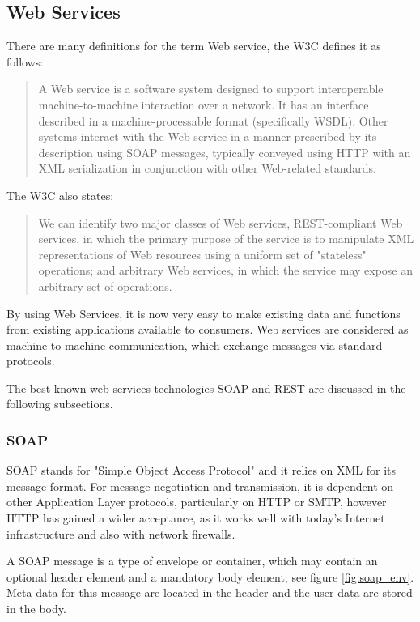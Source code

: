 \subsection{Web Services\label{sec:back_tech_ws}}

There are many definitions for the term Web service, the \ac{W3C} defines it as follows:\cite{W3C}\\
\begin{quote}
A Web service is a software system designed to support interoperable machine-to-machine interaction over a network. It has an interface described in a machine-processable format (specifically \ac{WSDL}). Other systems interact with the Web service in a manner prescribed by its description using \ac{SOAP} messages, typically conveyed using \ac{HTTP} with an \ac{XML} serialization in conjunction with other Web-related standards.
\end{quote}

The \ac{W3C} also states:\cite{W3C} 
\begin{quote}
We can identify two major classes of Web services, \ac{REST}-compliant Web services, in which the primary purpose of the service is to manipulate \ac{XML} representations of Web resources using a uniform set of "stateless" operations; and arbitrary Web services, in which the service may expose an arbitrary set of operations.
\end{quote}

By using Web Services, it is now very easy to make existing data and functions from existing applications available to consumers. Web services are considered as machine to machine communication, which  exchange messages via standard protocols.

The best known web services technologies \ac{SOAP} and \ac{REST} are discussed in the following subsections.

\subsubsection{SOAP\label{sec:back_tech_ws_soap}}
\ac{SOAP} stands for "Simple Object Access Protocol" and it relies on  \ac{XML} for its message format. For message negotiation and transmission, it is dependent on other Application Layer protocols, particularly on \ac{HTTP} or  \ac{SMTP}, however \ac{HTTP} has gained a wider acceptance, as it works well with today's Internet infrastructure and also with network firewalls.

A \ac{SOAP} message is a type of envelope or container, which may contain an optional header element and a mandatory body element, see figure \ref{fig:soap_env}. Meta-data for this message are located in the header and the user data are stored in the body.

